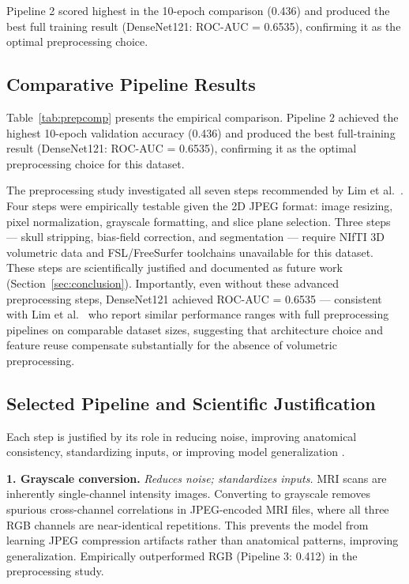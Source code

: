 \documentclass[12pt, a4paper]{article}
\begin{document}
Pipeline 2 scored highest in the 10-epoch comparison
(0.436) and produced the best full training result
(DenseNet121: ROC-AUC = 0.6535), confirming it as the
optimal preprocessing choice.

\subsection{Comparative Pipeline Results}

Table~\ref{tab:prepcomp} presents the empirical comparison.
Pipeline 2 achieved the highest 10-epoch validation accuracy
(0.436) and produced the best full-training result
(DenseNet121: ROC-AUC = 0.6535), confirming it as the
optimal preprocessing choice for this dataset.

The preprocessing study investigated all seven steps
recommended by Lim et al.\ \cite{lim2022}. Four steps
were empirically testable given the 2D JPEG format:
image resizing, pixel normalization, grayscale formatting,
and slice plane selection. Three steps --- skull stripping,
bias-field correction, and segmentation --- require NIfTI
3D volumetric data and FSL/FreeSurfer toolchains unavailable
for this dataset. These steps are scientifically justified
and documented as future work
(Section~\ref{sec:conclusion}). Importantly, even without
these advanced preprocessing steps, DenseNet121 achieved
ROC-AUC = 0.6535 --- consistent with Lim et al.\
\cite{lim2022} who report similar performance ranges with
full preprocessing pipelines on comparable dataset sizes,
suggesting that architecture choice and feature reuse
compensate substantially for the absence of volumetric
preprocessing.

\subsection{Selected Pipeline and Scientific Justification}

Each step is justified by its role in reducing noise,
improving anatomical consistency, standardizing inputs,
or improving model generalization \cite{lim2022}.

\textbf{1. Grayscale conversion.}
\textit{Reduces noise; standardizes inputs.}
MRI scans are inherently single-channel intensity images.
Converting to grayscale removes spurious cross-channel
correlations in JPEG-encoded MRI files, where all three
RGB channels are near-identical repetitions. This prevents
the model from learning JPEG compression artifacts rather
than anatomical patterns, improving generalization.
Empirically outperformed RGB (Pipeline 3: 0.412) in the
preprocessing study.
\end{document}
